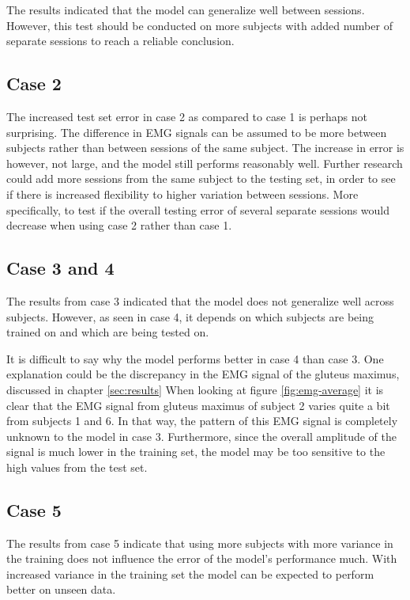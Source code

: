 \documentclass[../main.tex]{subfiles}
\begin{document}
The results indicated that the model can generalize well between sessions.
However, this test should be conducted on more subjects with added number of separate sessions to reach a reliable conclusion.

\subsection{Case 2}
\label{sec:discussion-case2}
The increased test set error in case 2 as compared to case 1 is perhaps not surprising. 
The difference in \ac{EMG} signals can be assumed to be more between subjects rather than between sessions of the same subject.
The increase in error is however, not large, and the model still performs reasonably well.
Further research could add more sessions from the same subject to the testing set, in order to see if there is increased flexibility to higher variation between sessions.
More specifically, to test if the overall testing error of several separate sessions would decrease when using case 2 rather than case 1.

\subsection{Case 3 and 4}
\label{sec:discussion-case3and4}
The results from case 3 indicated that the model does not generalize well across subjects.
However, as seen in case 4, it depends on which subjects are being trained on and which are being tested on.

It is difficult to say why the model performs better in case 4 than case 3.
One explanation could be the discrepancy in the \ac{EMG} signal of the gluteus maximus, discussed in chapter \ref{sec:results}
When looking at figure \ref{fig:emg-average} it is clear that the \ac{EMG} signal from gluteus maximus of subject 2 varies quite a bit from subjects 1 and 6.
In that way, the pattern of this \ac{EMG} signal is completely unknown to the model in case 3.
Furthermore, since the overall amplitude of the signal is much lower in the training set, the model may be too sensitive to the high values from the test set.

\subsection{Case 5}
\label{sec:discussion-case5}
The results from case 5 indicate that using more subjects with more variance in the training does not influence the error of the model's performance much.
With increased variance in the training set the model can be expected to perform better on unseen data.
\end{document}

